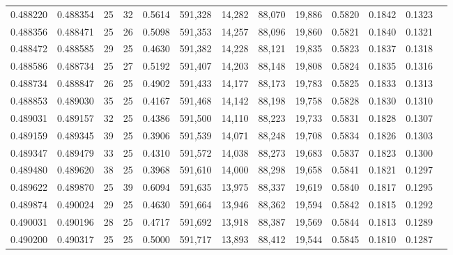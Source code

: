 \begin{tabular}{rrrrrrrrrrrrr}
0.488220 & 0.488354 &    25 &  32 &                                     0.5614 & 591,328 &  14,282 &  88,070 &  19,886 & 0.5820 & 0.1842 & 0.1323 \\
0.488356 & 0.488471 &    25 &  26 &                                     0.5098 & 591,353 &  14,257 &  88,096 &  19,860 & 0.5821 & 0.1840 & 0.1321 \\
0.488472 & 0.488585 &    29 &  25 &                                     0.4630 & 591,382 &  14,228 &  88,121 &  19,835 & 0.5823 & 0.1837 & 0.1318 \\
0.488586 & 0.488734 &    25 &  27 &                                     0.5192 & 591,407 &  14,203 &  88,148 &  19,808 & 0.5824 & 0.1835 & 0.1316 \\
0.488734 & 0.488847 &    26 &  25 &                                     0.4902 & 591,433 &  14,177 &  88,173 &  19,783 & 0.5825 & 0.1833 & 0.1313 \\
0.488853 & 0.489030 &    35 &  25 &                                     0.4167 & 591,468 &  14,142 &  88,198 &  19,758 & 0.5828 & 0.1830 & 0.1310 \\
0.489031 & 0.489157 &    32 &  25 &                                     0.4386 & 591,500 &  14,110 &  88,223 &  19,733 & 0.5831 & 0.1828 & 0.1307 \\
0.489159 & 0.489345 &    39 &  25 &                                     0.3906 & 591,539 &  14,071 &  88,248 &  19,708 & 0.5834 & 0.1826 & 0.1303 \\
0.489347 & 0.489479 &    33 &  25 &                                     0.4310 & 591,572 &  14,038 &  88,273 &  19,683 & 0.5837 & 0.1823 & 0.1300 \\
0.489480 & 0.489620 &    38 &  25 &                                     0.3968 & 591,610 &  14,000 &  88,298 &  19,658 & 0.5841 & 0.1821 & 0.1297 \\
0.489622 & 0.489870 &    25 &  39 &                                     0.6094 & 591,635 &  13,975 &  88,337 &  19,619 & 0.5840 & 0.1817 & 0.1295 \\
0.489874 & 0.490024 &    29 &  25 &                                     0.4630 & 591,664 &  13,946 &  88,362 &  19,594 & 0.5842 & 0.1815 & 0.1292 \\
0.490031 & 0.490196 &    28 &  25 &                                     0.4717 & 591,692 &  13,918 &  88,387 &  19,569 & 0.5844 & 0.1813 & 0.1289 \\
0.490200 & 0.490317 &    25 &  25 &                                     0.5000 & 591,717 &  13,893 &  88,412 &  19,544 & 0.5845 & 0.1810 & 0.1287 \\

\end{tabular}
